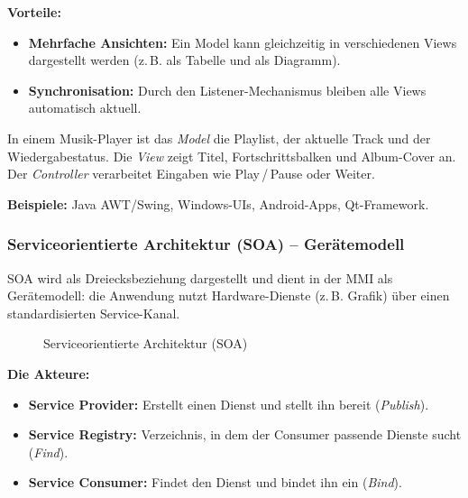 \documentclass[12pt, a4paper]{article}
\begin{document}
\textbf{Vorteile:}
\begin{itemize}
  \item \textbf{Mehrfache Ansichten:} Ein Model kann gleichzeitig in verschiedenen
        Views dargestellt werden (z.\,B. als Tabelle und als Diagramm).
  \item \textbf{Synchronisation:} Durch den Listener-Mechanismus bleiben alle
        Views automatisch aktuell.
\end{itemize}

\begin{examplebox}
  In einem Musik-Player ist das \textit{Model} die Playlist, der aktuelle Track und
  der Wiedergabestatus. Die \textit{View} zeigt Titel, Fortschrittsbalken und
  Album-Cover an. Der \textit{Controller} verarbeitet Eingaben wie Play\,/\,Pause
  oder Weiter.
\end{examplebox}

\textbf{Beispiele:} Java AWT/Swing, Windows-UIs, Android-Apps, Qt-Framework.

\subsubsection{Serviceorientierte Architektur (SOA) -- Gerätemodell}

SOA wird als Dreiecksbeziehung dargestellt und dient in der MMI als Gerätemodell:
die Anwendung nutzt Hardware-Dienste (z.\,B. Grafik) über einen standardisierten
Service-Kanal.

\begin{figure}[H]
\centering
{}
\caption{Serviceorientierte Architektur (SOA)}
\end{figure}

\textbf{Die Akteure:}
\begin{itemize}
  \item \textbf{Service Provider:} Erstellt einen Dienst und stellt ihn bereit
        (\textit{Publish}).
  \item \textbf{Service Registry:} Verzeichnis, in dem der Consumer passende
        Dienste sucht (\textit{Find}).
  \item \textbf{Service Consumer:} Findet den Dienst und bindet ihn ein
        (\textit{Bind}).
\end{itemize}
\end{document}
